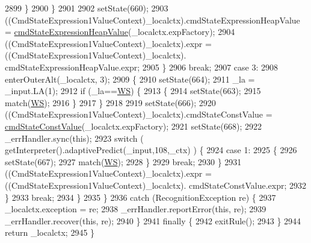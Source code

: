 \begin{DoxyCode}
2899           \}
2900         \}
2901 
2902         setState(660);
2903         ((CmdStateExpression1ValueContext)\_localctx).cmdStateExpressionHeapValue = 
      \hyperlink{classgov_1_1nasa_1_1jpf_1_1inspector_1_1server_1_1expression_1_1parser_1_1_expression_grammar_parser_acdd2121f4c72d731261a0733e15bcfe6}{cmdStateExpressionHeapValue}(\_localctx.expFactory);
2904          ((CmdStateExpression1ValueContext)\_localctx).expr =  ((CmdStateExpression1ValueContext)\_localctx).
      cmdStateExpressionHeapValue.expr; 
2905         \}
2906         \textcolor{keywordflow}{break};
2907       \textcolor{keywordflow}{case} 3:
2908         enterOuterAlt(\_localctx, 3);
2909         \{
2910         setState(664);
2911         \_la = \_input.LA(1);
2912         \textcolor{keywordflow}{if} (\_la==\hyperlink{classgov_1_1nasa_1_1jpf_1_1inspector_1_1server_1_1expression_1_1parser_1_1_expression_grammar_parser_ace44714ae633c7b14794cc5a24d9ebf3}{WS}) \{
2913           \{
2914           setState(663);
2915           match(\hyperlink{classgov_1_1nasa_1_1jpf_1_1inspector_1_1server_1_1expression_1_1parser_1_1_expression_grammar_parser_ace44714ae633c7b14794cc5a24d9ebf3}{WS});
2916           \}
2917         \}
2918 
2919         setState(666);
2920         ((CmdStateExpression1ValueContext)\_localctx).cmdStateConstValue = 
      \hyperlink{classgov_1_1nasa_1_1jpf_1_1inspector_1_1server_1_1expression_1_1parser_1_1_expression_grammar_parser_a86b5c0db5219832726e50e8e4b168ac2}{cmdStateConstValue}(\_localctx.expFactory);
2921         setState(668);
2922         \_errHandler.sync(\textcolor{keyword}{this});
2923         \textcolor{keywordflow}{switch} ( getInterpreter().adaptivePredict(\_input,108,\_ctx) ) \{
2924         \textcolor{keywordflow}{case} 1:
2925           \{
2926           setState(667);
2927           match(\hyperlink{classgov_1_1nasa_1_1jpf_1_1inspector_1_1server_1_1expression_1_1parser_1_1_expression_grammar_parser_ace44714ae633c7b14794cc5a24d9ebf3}{WS});
2928           \}
2929           \textcolor{keywordflow}{break};
2930         \}
2931          ((CmdStateExpression1ValueContext)\_localctx).expr =  ((CmdStateExpression1ValueContext)\_localctx).
      cmdStateConstValue.expr; 
2932         \}
2933         \textcolor{keywordflow}{break};
2934       \}
2935     \}
2936     \textcolor{keywordflow}{catch} (RecognitionException re) \{
2937       \_localctx.exception = re;
2938       \_errHandler.reportError(\textcolor{keyword}{this}, re);
2939       \_errHandler.recover(\textcolor{keyword}{this}, re);
2940     \}
2941     \textcolor{keywordflow}{finally} \{
2942       exitRule();
2943     \}
2944     \textcolor{keywordflow}{return} \_localctx;
2945   \}
\end{DoxyCode}
